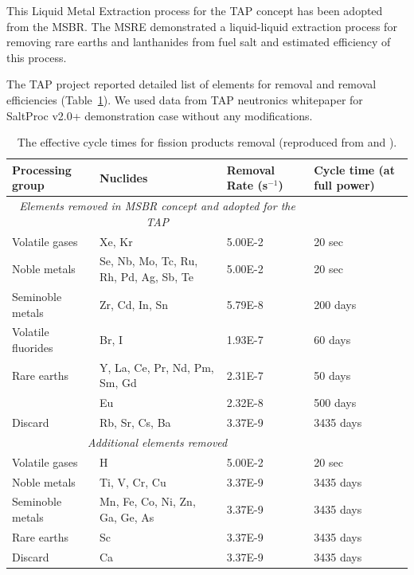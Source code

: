 \documentclass[12pt]{article} %
\begin{document}
This Liquid Metal Extraction process for the \gls{TAP} concept has been adopted from 
the \gls{MSBR}. The \gls{MSRE} demonstrated a liquid-liquid extraction process 
for removing rare earths and lanthanides from fuel salt and estimated efficiency 
of this process.

The \gls{TAP} project reported detailed list of elements for removal and removal 
efficiencies (Table~\ref{tab:reprocessing_list}). We used data from \gls{TAP} 
neutronics whitepaper\cite{transatomic_power_corporation_neutronics_2016} for 
SaltProc v2.0+  demonstration case without any modifications.
\begin{table}[ht!]
        \centering
        \caption{The effective cycle times for fission products removal (reproduced from \cite{betzler_implementation_2017} and \cite{transatomic_power_corporation_neutronics_2016}).}
        \begin{tabular}{p{} p{} p{} p{}}
        \hline 
        Processing group & \qquad\qquad\qquad Nuclides & Removal Rate (s$^{-1}$) & Cycle time (at full power) \\ [5pt] \hline 
 \multicolumn{3}{c}{\textit{Elements removed in \gls{MSBR} concept and adopted for the \gls{TAP}} \cite{robertson_conceptual_1971}} \\
        Volatile gases & Xe, Kr								  & 5.00E-2 & 20 sec \\ [5pt]
        Noble metals & Se, Nb, Mo, Tc, Ru, Rh, Pd, Ag, Sb, Te & 5.00E-2 & 20 sec \\ [5pt]
        Seminoble metals & Zr, Cd, In, Sn	  				  & 5.79E-8 & 200 days \\ [5pt]
        Volatile fluorides & Br, I 							  & 1.93E-7 & 60 days \\ [5pt]
        Rare earths & Y, La, Ce, Pr, Nd, Pm, Sm, Gd           & 2.31E-7 & 50 days \\ [5pt]
        \qquad & Eu & 2.32E-8 & 500 days \\ [5pt]
        Discard & Rb, Sr, Cs, Ba & 3.37E-9 & 3435 days \\ [5pt] 
        \hline
 
 \multicolumn{3}{c}{\textit{Additional elements removed} \cite{transatomic_power_corporation_neutronics_2016, betzler_implementation_2017}  } \\
        Volatile gases & H								  	& 5.00E-2 & 20 sec    \\ [5pt]
        Noble metals & Ti, V, Cr, Cu						& 3.37E-9 & 3435 days \\ [5pt]
        Seminoble metals & Mn, Fe, Co, Ni, Zn, Ga, Ge, As   & 3.37E-9 & 3435 days \\ [5pt]
        Rare earths & Sc									& 3.37E-9 & 3435 days \\ [5pt]
        Discard & Ca										& 3.37E-9 & 3435 days \\ [5pt] 
        \hline
        \end{tabular}
        \label{tab:reprocessing_list}
          \vspace{-0.9em}
\end{table}
\end{document}
